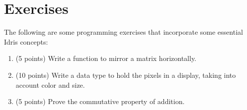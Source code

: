 \section{Exercises}

The following are some programming exercises that incorporate
some essential Idris concepts:

\begin{enumerate}



\item (5 points) Write a function to mirror a matrix horizontally. \tn

\item (10 points) Write a data type to hold the pixels in a display, taking into account color and size. \tn

\item (5 points) Prove the commutative property of addition. \tn

\end{enumerate}